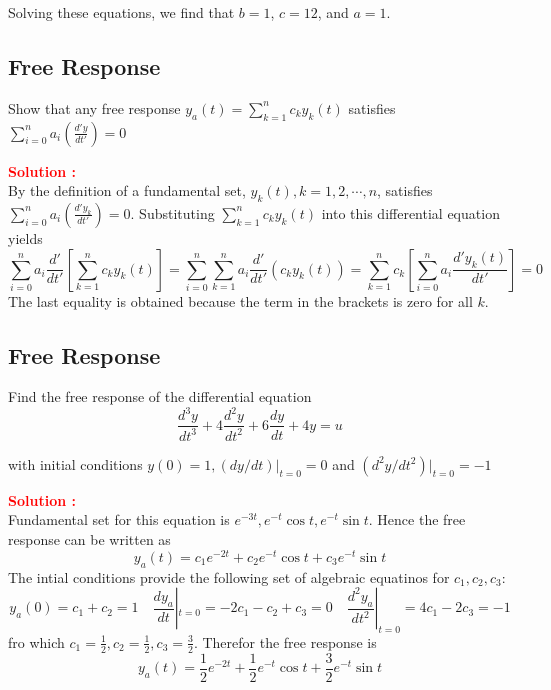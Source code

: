 \documentclass[12pt]{article}
\begin{document}
Solving these equations, we find that \( b = 1 \), \( c = 12 \), and \( a = 1 \).

\clearpage
\subsection{Free Response}

Show that any free response \(y_a(t) = \sum_{k=1}^n c_k y_k(t)\) satisfies \(\sum_{i=0}^n a_i(\frac{d'y}{dt'}) = 0\)


\textbf{\textcolor{red}{Solution :}} \\

By the definition of a fundamental set, \(y_k(t), k=1,2,\cdots,n\), satisfies \(\sum_{i=0}^n a_i(\frac{d'y_k}{dt'}) = 0\). Substituting \(\sum_{k=1}^n c_k y_k(t)\) into this differential equation yields
\begin{equation}
    \sum_{i=0}^n a_i \frac{d'}{dt'} \left[ \sum_{k=1}^n c_k y_k(t) \right] = \sum_{i=0}^n \sum_{k=1}^n a_i \frac{d'}{dt'}(c_k y_k(t)) = \sum_{k=1}^n c_k \left[ \sum_{i=0}^n a_i \frac{d'y_k(t)}{dt'}\right] = 0
\end{equation}
The last equality is obtained because the term in the brackets is zero for all \(k\).

\clearpage
\subsection{Free Response}

Find the free response of the differential equation
\begin{equation}
    \frac{d^3y}{dt^3} + 4 \frac{d^2y}{dt^2} + 6 \frac{dy}{dt} + 4y = u
\end{equation}

with initial conditions \(y(0)=1, (dy/dt)|_{t=0} = 0\) and \((d^2y/dt^2)|_{t=0} = -1\)

\textbf{\textcolor{red}{Solution :}} \\
Fundamental set for this equation is \(e^{-3t},e^{-t}\cos t,e^{-t}\sin t\). Hence the free response can be written as 
\begin{equation}
    y_a(t) = c_1 e^{-2t} + c_2 e^{-t}\cos t + c_3 e^{-t} \sin t
\end{equation}
The intial conditions provide the following set of algebraic equatinos for \(c_1,c_2,c_3\):
\begin{equation}
    y_a(0) = c_1 + c_2 = 1 \quad \frac{dy_a}{dt}|_{t=0} = -2c_1 -c_2 + c_3 = 0 \quad \frac{d^2y_a}{dt^2}|_{t=0} = 4c_1 -2 c_3 = -1
\end{equation}
fro which \(c_1 = \frac{1}{2}, c_2 = \frac{1}{2}, c_3 = \frac{3}{2}\). Therefor the free response is 
\begin{equation}
    y_a(t) = \frac{1}{2}e^{-2t} + \frac{1}{2} e^{-t}\cos t + \frac{3}{2} e^{-t} \sin t
\end{equation}
\end{document}
